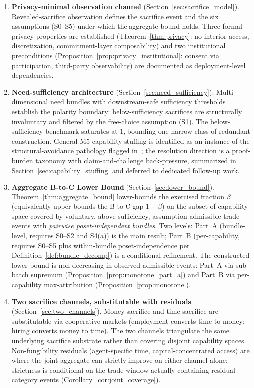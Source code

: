 \begin{enumerate}
\item \textbf{Privacy-minimal observation channel}
  (Section~\ref{sec:sacrifice_model}).
  Revealed-sacrifice observation defines the sacrifice event and
  the six assumptions (S0--S5) under which the aggregate bound
  holds.  Three formal privacy properties are established
  (Theorem~\ref{thm:privacy}: no interior access, discretization,
  commitment-layer composability) and two institutional
  preconditions (Proposition~\ref{prop:privacy_institutional}:
  consent via participation, third-party observability) are
  documented as deployment-level dependencies.

\item \textbf{Need-sufficiency architecture}
  (Section~\ref{sec:need_sufficiency}).
  Multi-dimensional need bundles with downstream-safe sufficiency
  thresholds establish the polarity boundary: below-sufficiency
  sacrifices are structurally involuntary and filtered by the
  free-choice assumption (S1).  The below-sufficiency benchmark
  saturates at $1$, bounding one narrow class of redundant
  construction.  General M5 capability-stuffing is identified as
  an instance of the structural-avoidance pathology flagged
  in~\citep[Discussion]{lasser2026poset}; the resolution
  direction is a proof-burden taxonomy with claim-and-challenge
  back-pressure, summarized in
  Section~\ref{sec:capability_stuffing} and deferred to dedicated
  follow-up work.

\item \textbf{Aggregate B-to-C Lower Bound}
  (Section~\ref{sec:lower_bound}).
  Theorem~\ref{thm:aggregate_bound} lower-bounds the exercised
  fraction $\beta$ (equivalently upper-bounds the B-to-C gap
  $1-\beta$) on the subset of capability-space covered by
  voluntary, above-sufficiency, assumption-admissible trade
  events with \emph{pairwise poset-independent bundles}.  Two
  levels: Part~A (bundle-level, requires S0--S2 and S4(a))
  is the main result; Part~B (per-capability, requires S0--S5
  plus within-bundle poset-independence per
  Definition~\ref{def:bundle_decomp}) is a conditional
  refinement.  The constructed lower bound is non-decreasing in
  observed admissible events: Part~A via sub-batch supremum
  (Proposition~\ref{prop:monotone_part_a}) and Part~B via
  per-capability max-attribution
  (Proposition~\ref{prop:monotone}).

\item \textbf{Two sacrifice channels, substitutable with
  residuals}
  (Section~\ref{sec:two_channels}).
  Money-sacrifice and time-sacrifice are substitutable via
  cooperative markets (employment converts time to money;
  hiring converts money to time).  The two channels triangulate
  the same underlying sacrifice substrate rather than covering
  disjoint capability spaces.  Non-fungibility residuals
  (agent-specific time, capital-concentrated access) are where
  the joint aggregate can strictly improve on either channel
  alone; strictness is conditional on the trade window actually
  containing residual-category events
  (Corollary~\ref{cor:joint_coverage}).


\end{enumerate}
